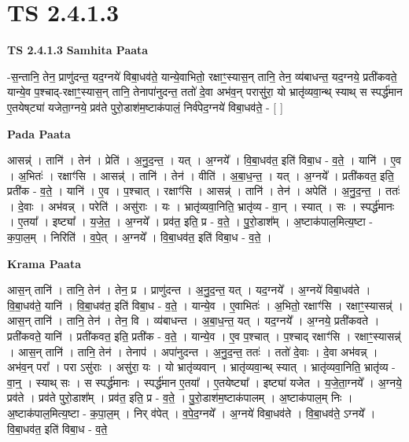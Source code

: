 \documentclass[17pt]{extarticle}
\begin{document}
\section*{ TS 2.4.1.3 }

\textbf{TS 2.4.1.3 } \newline
\textbf{Samhita Paata} \newline

-स॒न्तानि॒ तेन॒ प्राणु॑दन्त॒ यद॒ग्नये॑ विबा॒धव॑ते॒ यान्ये॒वाभितो॒ रक्षाꣳ॒॒स्यास॒न् तानि॒ तेन॒ व्य॑बाधन्त॒ यद॒ग्नये॒ प्रती॑कवते॒ यान्ये॒व प॒श्चाद्-रक्षाꣳ॒॒स्यास॒न् तानि॒ तेनापा॑नुदन्त॒ ततो॑ दे॒वा अभ॑व॒न् परासु॑रा॒ यो भ्रातृ॑व्यवा॒न्थ् स्याथ् स स्पर्द्ध॑मान ए॒तयेष्‌ट्या॑ यजेता॒ग्नये॒ प्रव॑ते पुरो॒डाश॑म॒ष्टाक॑पालं॒ निर्व॑पेद॒ग्नये॑ विबा॒धव॑ते॒ - [  ] \newline

\textbf{Pada Paata} \newline

आसन्न्॑ । तानि॑ । तेन॑ । प्रेति॑ । अ॒नु॒द॒न्त॒ । यत् । अ॒ग्नये᳚ । वि॒बा॒धव॑त॒ इति॑ विबा॒ध - व॒ते॒ । यानि॑ । ए॒व । अ॒भितः॑ । रक्षाꣳ॑सि । आसन्न्॑ । तानि॑ । तेन॑ । वीति॑ । अ॒बा॒ध॒न्त॒ । यत् । अ॒ग्नये᳚ । प्रती॑कवत॒ इति॒ प्रती॑क - व॒ते॒ । यानि॑ । ए॒व । प॒श्चात् । रक्षाꣳ॑सि । आसन्न्॑ । तानि॑ । तेन॑ ।   अपेति॑ । अ॒नु॒द॒न्त॒ । ततः॑ । दे॒वाः । अभ॑वन्न् । परेति॑ । असु॑राः । यः । भ्रातृ॑व्यवा॒निति॒ भ्रातृ॑व्य - वा॒न् । स्यात् । सः । स्पर्द्ध॑मानः । ए॒तया᳚ । इष्ट्या᳚ । य॒जे॒त॒ । अ॒ग्नये᳚ । प्रव॑त॒ इति॒ प्र - व॒ते॒ । पु॒रो॒डाश᳚म् । अ॒ष्टाक॑पाल॒मित्य॒ष्टा - क॒पा॒ल॒म् । निरिति॑ । व॒पे॒त् । अ॒ग्नये᳚ । वि॒बा॒धव॑त॒ इति॑ विबा॒ध - व॒ते॒ ।  \newline


\textbf{Krama Paata} \newline

आस॒न् तानि॑ । तानि॒ तेन॑ । तेन॒ प्र । प्राणु॑दन्त । अ॒नु॒द॒न्त॒ यत् । यद॒ग्नये᳚ । अ॒ग्नये॑ विबा॒धव॑ते । वि॒बा॒धव॑ते॒ यानि॑ । वि॒बा॒धव॑त॒ इति॑ विबा॒ध - व॒ते॒ । यान्ये॒व । ए॒वाभितः॑ । अ॒भितो॒ रक्षाꣳ॑सि । रक्षाꣳ॒॒स्यासन्न्॑ । आस॒न् तानि॑ । तानि॒ तेन॑ । तेन॒ वि । व्य॑बाधन्त । अ॒बा॒ध॒न्त॒ यत् । यद॒ग्नये᳚ । अ॒ग्नये॒ प्रती॑कवते । प्रती॑कवते॒ यानि॑ । प्रती॑कवत॒ इति॒ प्रती॑क - व॒ते॒ । यान्ये॒व । ए॒व प॒श्चात् । प॒श्चाद् रक्षाꣳ॑सि । रक्षाꣳ॒॒स्यासन्न्॑ । आस॒न् तानि॑ । तानि॒ तेन॑ । तेनाप॑ । अपा॑नुदन्त । अ॒नु॒द॒न्त॒ ततः॑ । ततो॑ दे॒वाः । दे॒वा अभ॑वन्न् । अभ॑व॒न् परा᳚ । परा ऽसु॑राः । असु॑रा॒ यः । यो भ्रातृ॑व्यवान् । भ्रातृ॑व्यवा॒न्थ् स्यात् । भ्रातृ॑व्यवा॒निति॒ भ्रातृ॑व्य - वा॒न्॒ । स्याथ् सः । स स्पर्द्ध॑मानः । स्पर्द्ध॑मान ए॒तया᳚ । ए॒तयेष्ट्या᳚ । इष्ट्या॑ यजेत । य॒जे॒ता॒ग्नये᳚ । अ॒ग्नये॒ प्रव॑ते । प्रव॑ते पुरो॒डाश᳚म् । प्रव॑त॒ इति॒ प्र - व॒ते॒ । पु॒रो॒डाश॑म॒ष्टाक॑पालम् । अ॒ष्टाक॑पाल॒म् निः । अ॒ष्टाक॑पाल॒मित्य॒ष्टा - क॒पा॒ल॒म् । निर् व॑पेत् । व॒पे॒द॒ग्नये᳚ । अ॒ग्नये॑ विबा॒धव॑ते । वि॒बा॒धव॑ते॒ ऽग्नये᳚ । वि॒बा॒धव॑त॒ इति॑ विबा॒ध - व॒ते॒ \newline
\end{document}
